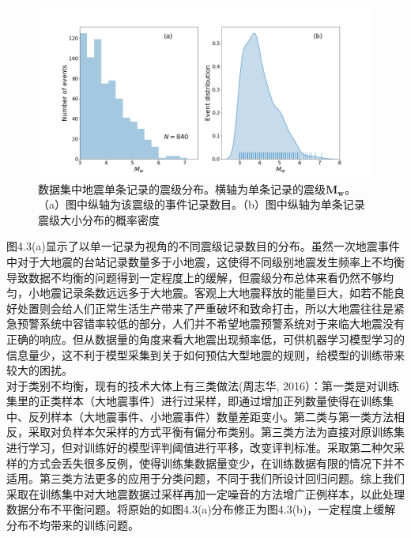 \begin{figure}[!h]%
	\centering  %
	\includegraphics[width=\linewidth]{img/Event_distribution.png}  %
	\caption{数据集中地震单条记录的震级分布。横轴为单条记录的震级$\mathbf{M}_{\mathbf{w}}$。\\
（a）图中纵轴为该震级的事件记录数目。（b）图中纵轴为单条记录震级大小分布的概率密度}  %
	\label{fig:mcmthesis-logo}   %
\end{figure}
\indent 图4.3(a)显示了以单一记录为视角的不同震级记录数目的分布。虽然一次地震事件中对于大地震的台站记录数量多于小地震，这使得不同级别地震发生频率上不均衡导致数据不均衡的问题得到一定程度上的缓解，但震级分布总体来看仍然不够均匀，小地震记录条数远远多于大地震。客观上大地震释放的能量巨大，如若不能良好处置则会给人们正常生活生产带来了严重破坏和致命打击，所以大地震往往是紧急预警系统中容错率较低的部分，人们并不希望地震预警系统对于来临大地震没有正确的响应。但从数据量的角度来看大地震出现频率低，可供机器学习模型学习的信息量少，这不利于模型采集到关于如何预估大型地震的规则，给模型的训练带来较大的困扰。\\
\indent 对于类别不均衡，现有的技术大体上有三类做法(周志华, 2016）：第一类是对训练集里的正类样本（大地震事件）进行过采样，即通过增加正列数量使得在训练集中、反列样本（大地震事件、小地震事件）数量差距变小。第二类与第一类方法相反，采取对负样本欠采样的方式平衡有偏分布类别。第三类方法为直接对原训练集进行学习，但对训练好的模型评判阈值进行平移，改变评判标准。采取第二种欠采样的方式会丢失很多反例，使得训练集数据量变少，在训练数据有限的情况下并不适用。第三类方法更多的应用于分类问题，不同于我们所设计回归问题。综上我们采取在训练集中对大地震数据过采样再加一定噪音的方法增广正例样本，以此处理数据分布不平衡问题。将原始的如图4.3(a)分布修正为图4.3(b)，一定程度上缓解分布不均带来的训练问题。\\
